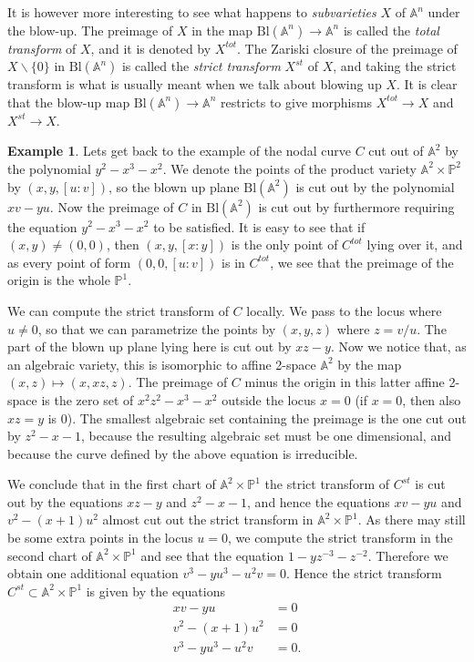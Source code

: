 \documentclass[12pt,a4paper,leqno]{article}
\newcommand{\Aff}{\mathbb{A}}
\newcommand{\Proj}{\mathbb{P}}
\newcommand{\bl}{\mathrm{Bl}}
\theoremstyle{plain}
\theoremstyle{definition}
\newtheorem{ex}[theo]{Example}
\theoremstyle{remark}
\begin{document}
It is however more interesting to see what happens to \emph{subvarieties} $X$ of $\Aff^n$ under the blow-up. The preimage of $X$ in the map $\bl (\Aff^n) \to \Aff^n$ is called the \emph{total transform} of $X$, and it is denoted by $X^{tot}$. The Zariski closure of the preimage of $X \backslash \{ 0 \}$ in $\bl (\Aff^n)$ is called the \emph{strict transform} $X^{st}$ of $X$, and taking the strict transform is what is usually meant when we talk about blowing up $X$. It is clear that the blow-up map $\bl (\Aff^n) \to \Aff^n$ restricts to give morphisms $X^{tot} \to X$ and $X^{st} \to X$.

\begin{ex}
Lets get back to the example of the nodal curve $C$ cut out of $\Aff^2$ by the polynomial $y^2 - x^3 - x^2$. We denote the points of the product variety $\Aff^2 \times \Proj^2$ by $(x,y, [u:v])$, so the blown up plane $\bl (\Aff^2)$ is cut out by the polynomial $xv - yu$. Now the preimage of $C$ in $\bl (\Aff^2)$ is cut out by furthermore requiring the equation $y^2 - x^3 - x^2$ to be satisfied. It is easy to see that if $(x,y) \not =  (0,0)$, then $(x,y,[x:y])$ is the only point of $C^{tot}$ lying over it, and as every point of form $(0,0, [u:v])$ is in $C^{tot}$, we see that the preimage of the origin is the whole $\Proj^1$.

We can compute the strict transform of $C$ locally. We pass to the locus where $u \not = 0$, so that we can parametrize the points by $(x,y,z)$ where $z = v/u$. The part of the blown up plane lying here is cut out by $xz - y$. Now we notice that, as an algebraic variety, this is isomorphic to affine 2-space $\Aff^2$ by the map $(x,z) \mapsto (x,xz,z)$. The preimage of $C$ minus the origin in this latter affine 2-space is the zero set of $x^2 z^2 - x^3 - x^2$ outside the locus $x=0$ (if $x=0$, then also $xz=y$ is 0). The smallest algebraic set containing the preimage is the one cut out by $z^2 - x - 1$, because the resulting algebraic set must be one dimensional, and because the curve defined by the above equation is irreducible. 

We conclude that in the first chart of $\Aff^2 \times \Proj^1$ the strict transform of $C^{st}$ is cut out by the equations $xz - y$ and $z^2 - x - 1$, and hence the equations $xv - yu$ and $v^2 - (x+1)u^2$ almost cut out the strict transform in $\Aff^2 \times \Proj^1$. As there may still be some extra points in the locus $u=0$, we compute the strict transform in the second chart of $\Aff^2 \times \Proj^1$ and see that the equation $1 - y z^{-3} - z^{-2}$. Therefore we obtain one additional equation $v^3 - yu^3 - u^2 v = 0$. Hence the strict transform $C^{st} \subset \Aff^2 \times \Proj^1$ is given by the equations
\begin{align*}
xv - yu &= 0 \\
v^2 - (x+1)u^2 &= 0 \\
v^3 - yu^3 - u^2 v &= 0.
\end{align*}
\end{ex}
\end{document}
